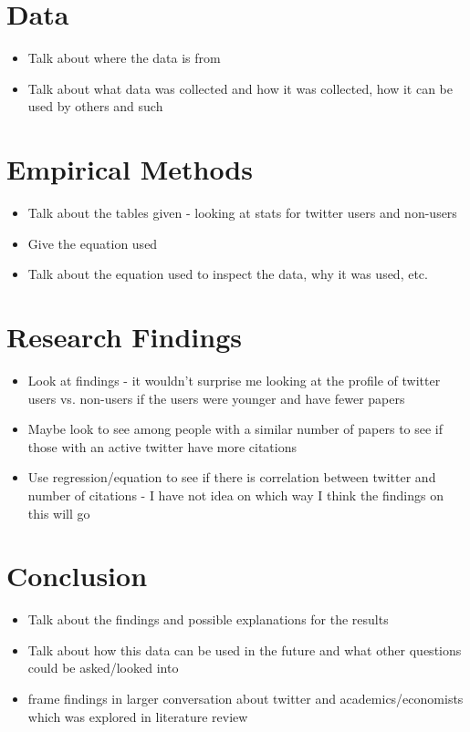 \documentclass[12pt,english]{article}
\begin{document}
\section{Data}\label{sec:data}

\begin{itemize}
    \item Talk about where the data is from
    \item Talk about what data was collected and how it was collected, how it can be used by others and such
\end{itemize}

\section{Empirical Methods}\label{sec:methods}

\begin{itemize}
    \item Talk about the tables given - looking at stats for twitter users and non-users
    \item Give the equation used
    \item Talk about the equation used to inspect the data, why it was used, etc.
\end{itemize}


\section{Research Findings}\label{sec:results}

\begin{itemize}
    \item Look at findings - it wouldn't surprise me looking at the profile of twitter users vs. non-users if the users were younger and have fewer papers
    \item Maybe look to see among people with a similar number of papers to see if those with an active twitter have more citations
    \item Use regression/equation to see if there is correlation between twitter and number of citations - I have not idea on which way I think the findings on this will go 
\end{itemize}

\section{Conclusion}\label{sec:conclusion}

\begin{itemize}
    \item Talk about the findings and possible explanations for the results
    \item Talk about how this data can be used in the future and what other questions could be asked/looked into
    \item frame findings in larger conversation about twitter and academics/economists which was explored in literature review
\end{itemize}

\vfill
\pagebreak{}
\begin{spacing}{1.0}


\end{spacing}

\vfill
\pagebreak{}
\clearpage
\end{document}
